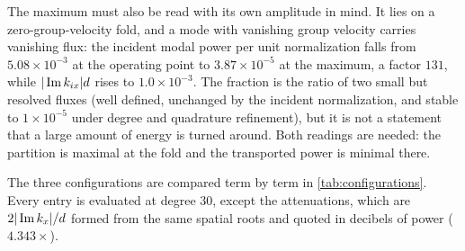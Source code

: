 The maximum must also be read with its own amplitude in mind.  It lies on a zero-group-velocity fold, and a mode with vanishing group velocity carries
vanishing flux: the incident modal power per unit normalization falls from
$5.08\times10^{-3}$ at the operating point to $3.87\times10^{-5}$ at the
maximum, a factor $131$, while $|\operatorname{Im} k_{ix}|d$ rises to $1.0\times10^{-3}$.
The fraction is the ratio of two small but resolved fluxes (well
defined, unchanged by the incident normalization, and stable to
$1\times10^{-5}$ under degree and quadrature refinement), but it is not a statement that a
large amount of energy is turned around.  Both readings are needed: the
partition is maximal at the fold and the transported power is minimal there.

The three configurations are compared term by term in
\cref{tab:configurations}.  Every entry is evaluated at degree 30, except the
attenuations, which are $2|\operatorname{Im} k_x|/d$ formed from the same spatial roots and quoted in decibels of power ($4.343\times$).

